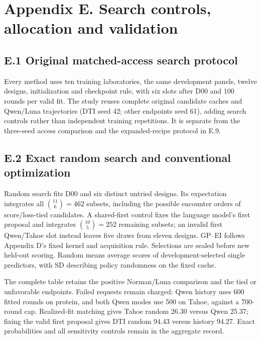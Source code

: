 \clearpage
\section*{Appendix E. Search controls, allocation and validation}
\label{app:rebuttal}
\suppressfloats[t]
\setcounter{table}{0}
\renewcommand{\thetable}{E.\arabic{table}}
\renewcommand{\theHtable}{E.\arabic{table}}

\subsection*{E.1 Original matched-access search protocol}
Every method uses ten training laboratories, the same development panels, twelve designs, initialization and checkpoint rule, with six slots after D00 and 100 rounds per valid fit. The study reuses complete original candidate caches and Qwen/Luna trajectories (DTI seed 42; other endpoints seed 61), adding search controls rather than independent training repetitions. It is separate from the three-seed access comparison and the expanded-recipe protocol in E.9.

\subsection*{E.2 Exact random search and conventional optimization}
Random search fits D00 and six distinct untried designs. Its expectation integrates all $\binom{11}{6}=462$ subsets, including the possible encounter orders of score/loss-tied candidates. A shared-first control fixes the language model's first proposal and integrates $\binom{10}{5}=252$ remaining subsets; an invalid first Qwen/Tahoe slot instead leaves five draws from eleven designs. GP--EI follows Appendix D's fixed kernel and acquisition rule. Selections are sealed before new held-out scoring. Random means average scores of development-selected single predictors, with SD describing policy randomness on the fixed cache.



The complete table retains the positive Norman/Luna comparison and the tied or unfavorable endpoints. Failed requests remain charged: Qwen history uses 600 fitted rounds on protein, and both Qwen modes use 500 on Tahoe, against a 700-round cap. Realized-fit matching gives Tahoe random 26.30 versus Qwen 25.37; fixing the valid first proposal gives DTI random 94.43 versus history 94.27. Exact probabilities and all sensitivity controls remain in the aggregate record.


